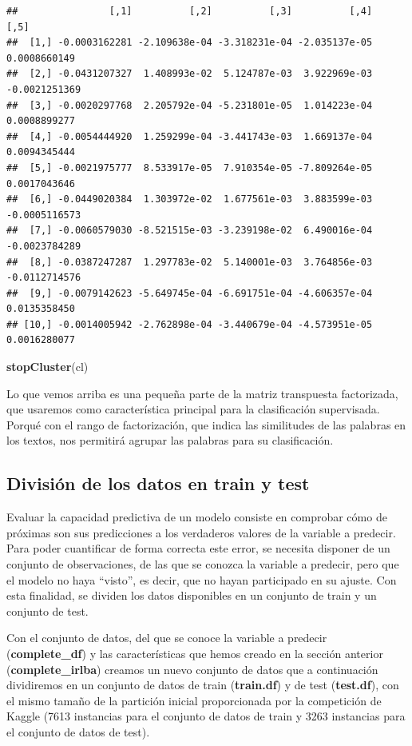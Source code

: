 \documentclass[]{article}
\newenvironment{Shaded}{\begin{snugshade}}{\end{snugshade}}
\newcommand{\KeywordTok}[1]{\textcolor[rgb]{0.13,0.29,0.53}{\textbf{#1}}}
\newcommand{\NormalTok}[1]{#1}
\begin{document}
\begin{verbatim}
##                [,1]          [,2]          [,3]          [,4]          [,5]
##  [1,] -0.0003162281 -2.109638e-04 -3.318231e-04 -2.035137e-05  0.0008660149
##  [2,] -0.0431207327  1.408993e-02  5.124787e-03  3.922969e-03 -0.0021251369
##  [3,] -0.0020297768  2.205792e-04 -5.231801e-05  1.014223e-04  0.0008899277
##  [4,] -0.0054444920  1.259299e-04 -3.441743e-03  1.669137e-04  0.0094345444
##  [5,] -0.0021975777  8.533917e-05  7.910354e-05 -7.809264e-05  0.0017043646
##  [6,] -0.0449020384  1.303972e-02  1.677561e-03  3.883599e-03 -0.0005116573
##  [7,] -0.0060579030 -8.521515e-03 -3.239198e-02  6.490016e-04 -0.0023784289
##  [8,] -0.0387247287  1.297783e-02  5.140001e-03  3.764856e-03 -0.0112714576
##  [9,] -0.0079142623 -5.649745e-04 -6.691751e-04 -4.606357e-04  0.0135358450
## [10,] -0.0014005942 -2.762898e-04 -3.440679e-04 -4.573951e-05  0.0016280077
\end{verbatim}

\begin{Shaded}
\begin{Highlighting}[]
\KeywordTok{stopCluster}\NormalTok{(cl)}
\end{Highlighting}
\end{Shaded}

Lo que vemos arriba es una pequeña parte de la matriz transpuesta factorizada, que usaremos como
característica principal para la clasificación supervisada. Porqué con el rango de factorización, que indica las similitudes de las palabras en los textos, nos permitirá agrupar las palabras para su clasificación.

\hypertarget{divisiuxf3n-de-los-datos-en-train-y-test}{%
\subsection{División de los datos en train y
test}\label{divisiuxf3n-de-los-datos-en-train-y-test}}

Evaluar la capacidad predictiva de un modelo consiste en comprobar cómo
de próximas son sus predicciones a los verdaderos valores de la variable
a predecir. Para poder cuantificar de forma correcta este error, se
necesita disponer de un conjunto de observaciones, de las que se conozca
la variable a predecir, pero que el modelo no haya ``visto'', es decir,
que no hayan participado en su ajuste. Con esta finalidad, se dividen
los datos disponibles en un conjunto de train y un conjunto de test.

Con el conjunto de datos, del que se conoce la variable a predecir
(\textbf{complete\_df}) y las características que hemos creado en la
sección anterior (\textbf{complete\_irlba}) creamos un nuevo conjunto de
datos que a continuación dividiremos en un conjunto de datos de train
(\textbf{train.df}) y de test (\textbf{test.df}), con el mismo tamaño de
la partición inicial proporcionada por la competición de Kaggle (7613
instancias para el conjunto de datos de train y 3263 instancias para el
conjunto de datos de test).
\end{document}
